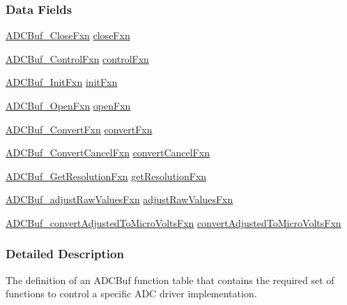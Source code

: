 \subsubsection*{Data Fields}
\begin{DoxyCompactItemize}
\item 
\hyperlink{_a_d_c_buf_8h_a94dfd94e96f6c7e15a9da57feddd60dc}{A\+D\+C\+Buf\+\_\+\+Close\+Fxn} \hyperlink{struct_a_d_c_buf___fxn_table_a443b411e8c7e9873f34c2f827a07fc6b}{close\+Fxn}
\item 
\hyperlink{_a_d_c_buf_8h_a24f4127b82e138fa18c8a54b4d914e05}{A\+D\+C\+Buf\+\_\+\+Control\+Fxn} \hyperlink{struct_a_d_c_buf___fxn_table_a89ea3261a27de9bfa94ba4299d0f6082}{control\+Fxn}
\item 
\hyperlink{_a_d_c_buf_8h_ab63b9bc37ab6f5fa2521c18b38c1881e}{A\+D\+C\+Buf\+\_\+\+Init\+Fxn} \hyperlink{struct_a_d_c_buf___fxn_table_aa7616fc3e78d72a3836b08f11632ac2d}{init\+Fxn}
\item 
\hyperlink{_a_d_c_buf_8h_ae6db2b63af06cf407f74c7d7779eb391}{A\+D\+C\+Buf\+\_\+\+Open\+Fxn} \hyperlink{struct_a_d_c_buf___fxn_table_adc31e28a3c2270c8159c5fb88ce14167}{open\+Fxn}
\item 
\hyperlink{_a_d_c_buf_8h_a57f40a75d77241e2fda473f0538e404d}{A\+D\+C\+Buf\+\_\+\+Convert\+Fxn} \hyperlink{struct_a_d_c_buf___fxn_table_af242d84a8ec0284b071b7ec14f77f54c}{convert\+Fxn}
\item 
\hyperlink{_a_d_c_buf_8h_a88bb1333e07a3fee27926064058d5d1b}{A\+D\+C\+Buf\+\_\+\+Convert\+Cancel\+Fxn} \hyperlink{struct_a_d_c_buf___fxn_table_a2803deeb90c108c539a340d711c51351}{convert\+Cancel\+Fxn}
\item 
\hyperlink{_a_d_c_buf_8h_aeff0bfa20eb16c3857b5123da136d320}{A\+D\+C\+Buf\+\_\+\+Get\+Resolution\+Fxn} \hyperlink{struct_a_d_c_buf___fxn_table_ac351196231c2ee97db44d1fa6410f3dd}{get\+Resolution\+Fxn}
\item 
\hyperlink{_a_d_c_buf_8h_a4a19f2deb010ca0ba5bdcf5586a8cb28}{A\+D\+C\+Buf\+\_\+adjust\+Raw\+Values\+Fxn} \hyperlink{struct_a_d_c_buf___fxn_table_a0b80725420ba691dc6a20505fcdf5522}{adjust\+Raw\+Values\+Fxn}
\item 
\hyperlink{_a_d_c_buf_8h_a6ffaac5eaa1253f9b78bbaa6952e1162}{A\+D\+C\+Buf\+\_\+convert\+Adjusted\+To\+Micro\+Volts\+Fxn} \hyperlink{struct_a_d_c_buf___fxn_table_a01e865f5a1ce7cbd748f05b16b87a39d}{convert\+Adjusted\+To\+Micro\+Volts\+Fxn}
\end{DoxyCompactItemize}


\subsubsection{Detailed Description}
The definition of an A\+D\+C\+Buf function table that contains the required set of functions to control a specific A\+D\+C driver implementation. 

